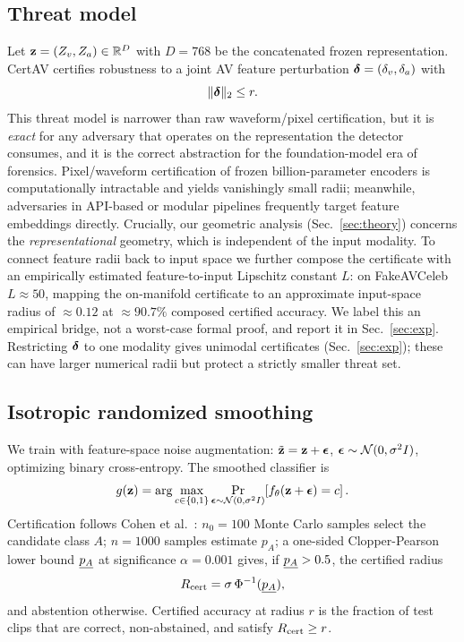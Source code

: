 \subsection{Threat model}
\label{ssec:threat}

Let ${\mathbf z}=(Z_v,Z_a)\in\mathbb{R}^D$ with $D=768$ be the concatenated frozen representation. CertAV certifies robustness to a joint AV feature perturbation ${\boldsymbol \delta}=(\delta_v,\delta_a)$ with
\begin{equation}
\|{\boldsymbol \delta}\|_2 \le r .
\end{equation}
This threat model is narrower than raw waveform/pixel certification, but it is \emph{exact} for any adversary that operates on the representation the detector consumes, and it is the correct abstraction for the foundation-model era of forensics. Pixel/waveform certification of frozen billion-parameter encoders is computationally intractable and yields vanishingly small radii; meanwhile, adversaries in API-based or modular pipelines frequently target feature embeddings directly. Crucially, our geometric analysis (Sec.~\ref{sec:theory}) concerns the \emph{representational} geometry, which is independent of the input modality. To connect feature radii back to input space we further compose the certificate with an empirically estimated feature-to-input Lipschitz constant $L$: on FakeAVCeleb $L\!\approx\!50$, mapping the on-manifold certificate to an approximate input-space radius of $\approx\!0.12$ at $\approx\!90.7\%$ composed certified accuracy. We label this an empirical bridge, not a worst-case formal proof, and report it in Sec.~\ref{sec:exp}. Restricting ${\boldsymbol \delta}$ to one modality gives unimodal certificates (Sec.~\ref{sec:exp}); these can have larger numerical radii but protect a strictly smaller threat set.

\subsection{Isotropic randomized smoothing}
\label{ssec:iso}

We train with feature-space noise augmentation: $\tilde{{\mathbf z}}={\mathbf z}+{\boldsymbol \epsilon}$, ${\boldsymbol \epsilon}\sim\mathcal{N}(0,\sigma^2 I)$, optimizing binary cross-entropy. The smoothed classifier is
\begin{equation}
g({\mathbf z})=\arg\max_{c\in\{0,1\}}\Pr_{{\boldsymbol \epsilon}\sim\mathcal{N}(0,\sigma^2 I)}\!\left[f_\theta({\mathbf z}+{\boldsymbol \epsilon})=c\right].
\label{eq:smoothed}
\end{equation}
Certification follows Cohen et al.~\cite{cohen2019certified}: $n_0=100$ Monte Carlo samples select the candidate class $A$; $n=1000$ samples estimate $p_A$; a one-sided Clopper-Pearson lower bound $\underline{p_A}$ at significance $\alpha=0.001$ gives, if $\underline{p_A}>0.5$, the certified radius
\begin{equation}
R_{\mathrm{cert}}=\sigma\,\Phi^{-1}(\underline{p_A}),
\label{eq:cohen}
\end{equation}
and abstention otherwise. Certified accuracy at radius $r$ is the fraction of test clips that are correct, non-abstained, and satisfy $R_{\mathrm{cert}}\ge r$.

